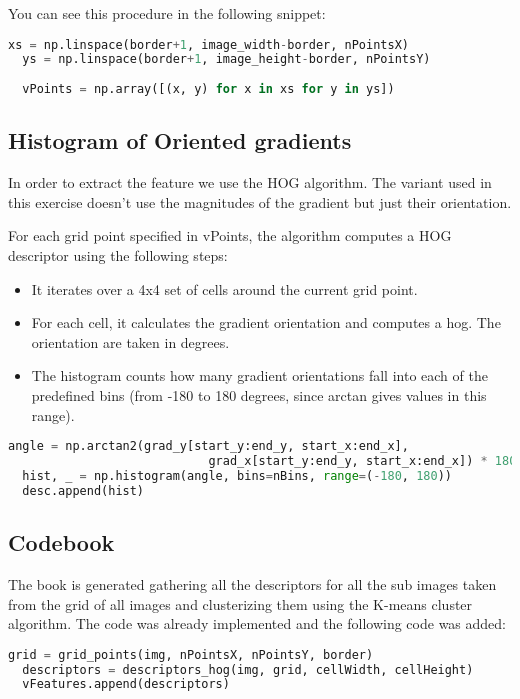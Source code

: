 \documentclass{ETHExercise}
\begin{document}
You can see this procedure in the following snippet:
\begin{lstlisting}[language=Python, caption=Grid creation]
  xs = np.linspace(border+1, image_width-border, nPointsX)
  ys = np.linspace(border+1, image_height-border, nPointsY)
  
  vPoints = np.array([(x, y) for x in xs for y in ys])
\end{lstlisting}



\subsection{Histogram of Oriented gradients}
In order to extract the feature we use the HOG algorithm. The variant
used in this exercise doesn't use the magnitudes of the gradient but just
their orientation.

For each grid point specified in vPoints, the algorithm computes a HOG descriptor using the following steps:
\begin{itemize}
  \item It iterates over a 4x4 set of cells around the current grid point.
  \item For each cell, it calculates the gradient orientation and computes a hog. The orientation are taken in degrees.
  \item The histogram counts how many gradient orientations fall into each of the predefined bins (from -180 to 180 degrees, since arctan gives values in this range).
\end{itemize}
\begin{lstlisting}[language=Python, caption=HOG]
  angle = np.arctan2(grad_y[start_y:end_y, start_x:end_x],
                            grad_x[start_y:end_y, start_x:end_x]) * 180 / np.pi           
  hist, _ = np.histogram(angle, bins=nBins, range=(-180, 180))
  desc.append(hist)
\end{lstlisting}


\subsection{Codebook}
The book is generated gathering all the descriptors for all the sub images 
taken from the grid of all images and clusterizing them using the K-means cluster
algorithm. The code was already implemented and the following code
was added:
\begin{lstlisting}[language=Python, caption=Codebook Generation]
  grid = grid_points(img, nPointsX, nPointsY, border)
  descriptors = descriptors_hog(img, grid, cellWidth, cellHeight)
  vFeatures.append(descriptors)
\end{lstlisting}
\end{document}
